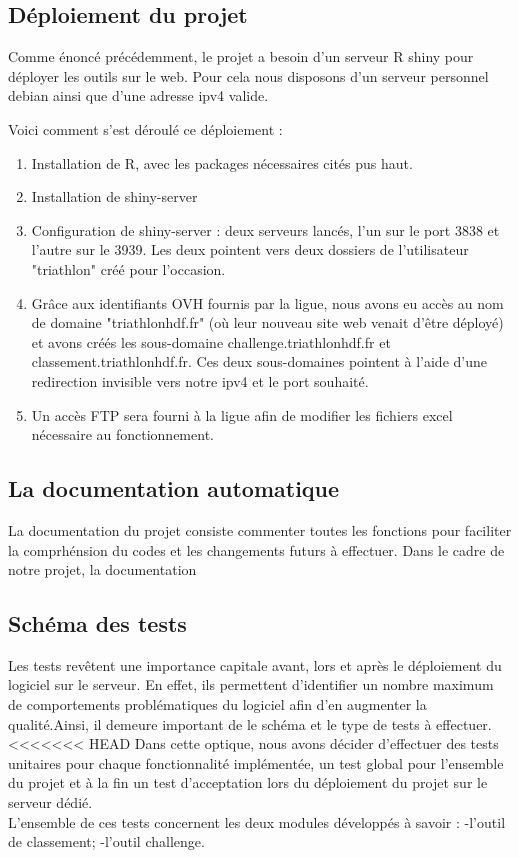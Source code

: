 \subsection {Déploiement du projet}

Comme énoncé précédemment, le projet a besoin d'un serveur R shiny pour déployer les outils sur le web.
Pour cela nous disposons d'un serveur personnel debian ainsi que d'une adresse ipv4 valide.

Voici comment s'est déroulé ce déploiement :

\begin{enumerate} 
	\item Installation de R, avec les packages nécessaires cités pus haut. \cite{ref2}
	\item Installation de shiny-server \cite{ref3}
	\item Configuration de shiny-server : deux serveurs lancés, l'un sur le port 3838 et l'autre sur le 3939. Les deux pointent vers deux dossiers de l'utilisateur "triathlon" créé pour l'occasion.
	\item Grâce aux identifiants OVH \cite{ref4} fournis par la ligue, nous avons eu accès au nom de domaine "triathlonhdf.fr" (où leur nouveau site web venait d'être déployé) et avons créés les sous-domaine challenge.triathlonhdf.fr et classement.triathlonhdf.fr. Ces deux sous-domaines pointent à l'aide d'une redirection invisible vers notre ipv4 et le port souhaité.
	\item Un accès FTP sera fourni à la ligue afin de modifier les fichiers excel nécessaire au fonctionnement.
\end{enumerate}


\subsection {La documentation automatique}
La documentation du projet consiste commenter toutes les fonctions pour faciliter la comprhénsion du codes et les changements futurs à effectuer.
Dans le cadre de notre projet,  la documentation  


\subsection {Schéma des tests}
Les tests revêtent une importance capitale avant, lors et après le déploiement du logiciel sur le serveur. En effet, ils permettent d'identifier un nombre maximum de comportements problématiques du logiciel afin d'en augmenter la qualité.Ainsi, il demeure important de  le schéma et le type de tests à effectuer. \\
<<<<<<< HEAD
Dans cette optique, nous avons décider d'effectuer des tests unitaires pour chaque fonctionnalité implémentée, un test global pour l'ensemble du projet et à la fin un test d'acceptation lors du déploiement du projet sur le serveur dédié.\\
L'ensemble de ces tests concernent les deux modules développés à savoir :
-l'outil de classement; 
-l'outil challenge.

